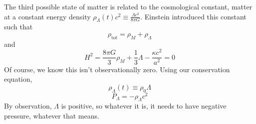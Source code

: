 \documentclass[a4paper,twoside,master.tex]{subfiles}
\begin{document}
The third possible state of matter is related to the cosmological constant, matter at a constant energy density $ \rho_{\Lambda}(t) c^2 \equiv \frac{\Lambda c^2}{8 \pi G} $. Einstein introduced this constant such that
\begin{equation}
    \rho_{\text{tot}} = \rho_M + \rho_{\Lambda}
\end{equation}
and
\begin{equation}
    H^2 = \frac{8 \pi G}{3} \rho_M + \frac{1}{3} \Lambda - \frac{\kappa c^2}{a^2} = 0
\end{equation}
Of course, we know this isn't observationally zero. Using our conservation equation,
\begin{equation}
    \rho_{\Lambda}(t) \equiv \rho_0 \Lambda
\end{equation}
\begin{equation}
    P_{\Lambda} = - \rho_{\Lambda} c^2
\end{equation}
By observation, $ \Lambda $ is positive, so whatever it is, it needs to have negative pressure, whatever that means.
\end{document}
